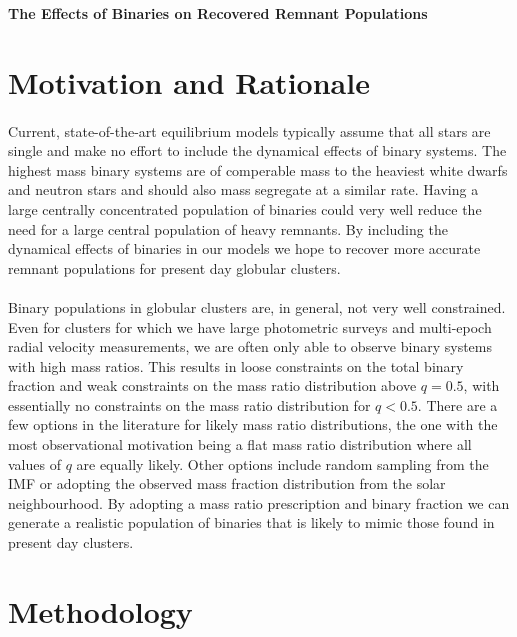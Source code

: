 \documentclass[12pt,letterpaper]{article}
\begin{document}
\begin{center}
	\Large{\textbf{The Effects of Binaries on Recovered Remnant Populations}}
\end{center}


\section{Motivation and Rationale}
\paragraph{}
Current, state-of-the-art equilibrium models typically assume that all stars are single and make no
effort to include the dynamical effects of binary systems. The highest mass binary systems are of
comperable mass to the heaviest white dwarfs and neutron stars and should also mass segregate at a
similar rate. Having a large centrally concentrated population of binaries could very well reduce
the need for a large central population of heavy remnants. By including the dynamical effects of
binaries in our models we hope to recover more accurate remnant populations for present day globular
clusters.


\paragraph{}
Binary populations in globular clusters are, in general, not very well constrained. Even for
clusters for which we have large photometric surveys and multi-epoch radial velocity measurements,
we are often only able to observe binary systems with high mass ratios. This results in loose
constraints on the total binary fraction and weak constraints on the mass ratio distribution above
$q = 0.5$, with essentially no constraints on the mass ratio distribution for $q < 0.5$. There are a
few options in the literature for likely mass ratio distributions, the one with the most
observational motivation being a flat mass ratio distribution where all values of $q$ are equally
likely. Other options include random sampling from the IMF or adopting the observed mass fraction
distribution from the solar neighbourhood. By adopting a mass ratio prescription and binary fraction
we can generate a realistic population of binaries that is likely to mimic those found in present
day clusters.



\section{Methodology}
\end{document}
